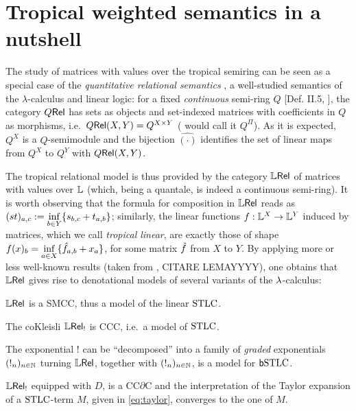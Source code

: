 \documentclass[submission,%
]{eptcs}
\begin{document}
\section{Tropical weighted semantics in a nutshell}

The study of matrices with values over the tropical semiring can be seen as a special case of the
\emph{quantitative relational semantics} \cite{Manzo2013}, a well-studied semantics of the $\lambda$-calculus and linear logic:
for a fixed \emph{continuous} semi-ring $Q$ [Def. II.5, \cite{Manzo2013}], the category $Q \mathsf{Rel}$ has sets as objects and set-indexed matrices with coefficients in $Q$ as morphisms, i.e.~$Q \mathsf{Rel}(X,Y)=Q^{X\times Y}$ (\cite{Manzo2013} would call it $Q^\Pi$).
As it is expected, $Q^X$ is a $Q$-semimodule and the bijection $\hat{(\cdot)}$ identifies the set of linear maps from $Q^X$ to $Q^Y$ with 
 ${Q \mathsf{Rel}}(X,Y)$.

The tropical relational model is thus provided by the category $\mathbb{L} \mathsf{Rel}$ of matrices with values over $\mathbb{L}$ (which, being a quantale, is indeed a continuous semi-ring).
It is worth observing that the formula for composition in $\mathbb{L} \mathsf{Rel}$ %
reads as \ $(st)_{a,c}:=\inf\limits_{b\in Y}\{s_{b,c}+t_{a,b}\}$;
 similarly, the linear functions $f:\mathbb{L}^X\to \mathbb{L}^Y$ induced by matrices, which we call \emph{tropical linear}, are exactly those of shape $f(x)_b=\inf\limits_{a\in X} \{\hat{f}_{a,b}+x_a\}$, for some matrix $\hat{f}$ from $X$ to $Y$.
By applying more or less well-known results (taken from \cite{Manzo2013}, CITARE LEMAYYYY), one obtains that $\mathbb{L} \mathsf{Rel}$ gives rise to denotational models of several variants of the $\lambda$-calculus:

\begin{fact}
 $\mathbb{L} \mathsf{Rel}$ is a SMCC, thus a model of the linear $\mathrm{STLC}$.

 The coKleisli $\mathbb{L} \mathsf{Rel}_!$ is CCC, i.e.\ a model of $\mathrm{STLC}$.

The exponential $!$ can be ``decomposed'' into a family of \emph{graded} exponentials $(!_n)_{n\in\mathbb{N}}$ turning $\mathbb{L} \mathsf{Rel}$, together with $(!_n)_{n\in\mathbb{N}}$, is a model for $\mathsf b\mathrm{STLC}$. 

 $\mathbb{L} \mathsf{Rel}_!$ equipped with $D$, is a CC$\partial$C and the interpretation of the Taylor expansion of a $\mathrm{STLC}$-term $M$, given in \eqref{eq:taylor}, converges to the one of $M$.
\end{fact}
\end{document}
